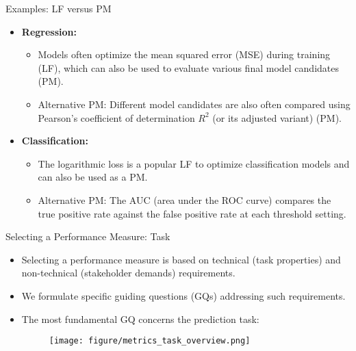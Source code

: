 \documentclass[11pt,compress,t,notes=noshow, aspectratio=169, xcolor=table]{beamer}
\begin{document}
\begin{frame}{Examples: LF versus PM}

\begin{itemize}
    \item \textbf{Regression:}
        \begin{itemize} 
            \item Models often optimize the mean squared error (MSE) during training (LF), which can also be used to evaluate various final model candidates (PM).
            \item Alternative PM: Different model candidates are also often compared using Pearson's coefficient of determination $R^2$ (or its adjusted variant) (PM).
        \end{itemize}
    \item \textbf{Classification:}
        \begin{itemize}
            \item The logarithmic loss is a popular LF to optimize classification models and can also be used as a PM.
            \item Alternative PM: The AUC (area under the ROC curve) compares the true positive rate against the false positive rate at each threshold setting.
        \end{itemize}
\end{itemize}    
\end{frame}



\begin{frame}{Selecting a Performance Measure: Task}

\begin{itemize}
    \item Selecting a performance measure is based on technical (task properties) and non-technical (stakeholder demands) requirements.
    \item We formulate specific guiding questions (GQs) addressing such requirements.
    \item The most fundamental GQ concerns the prediction task:
    \begin{figure}
        \centering
        \texttt{[image: figure/metrics\_task\_overview.png]}
    \end{figure}
\end{itemize}
    
\end{frame}
\end{document}
